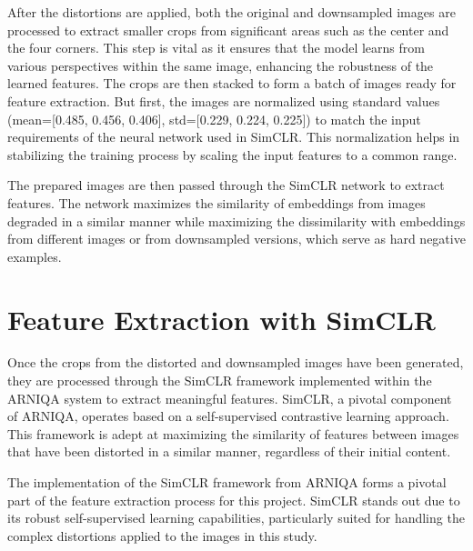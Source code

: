 \noindent
After the distortions are applied, both the original and downsampled images are processed to extract smaller crops from significant areas such as the center and the four corners. This step is vital as it ensures that the model learns from various perspectives within the same image, enhancing the robustness of the learned features. The crops are then stacked to form a batch of images ready for feature extraction. But first, the images are normalized using standard values (mean=[0.485, 0.456, 0.406], std=[0.229, 0.224, 0.225])  to match the input requirements of the neural network used in SimCLR. This normalization helps in stabilizing the training process by scaling the input features to a common range. \par
\vspace{\baselineskip}
\noindent
The prepared images are then passed through the SimCLR network to extract features. The network maximizes the similarity of embeddings from images degraded in a similar manner while maximizing the dissimilarity with embeddings from different images or from downsampled versions, which serve as hard negative examples. \par


\section{Feature Extraction with SimCLR}
\label{sec:FeatureExtraction}
Once the crops from the distorted and downsampled images have been generated, they are processed through the SimCLR framework implemented within the ARNIQA system to extract meaningful features. SimCLR, a pivotal component of ARNIQA, operates based on a self-supervised contrastive learning approach. This framework is adept at maximizing the similarity of features between images that have been distorted in a similar manner, regardless of their initial content. \par


The implementation of the SimCLR framework from ARNIQA forms a pivotal part of the feature extraction process for this project. SimCLR stands out due to its robust self-supervised learning capabilities, particularly suited for handling the complex distortions applied to the images in this study.

